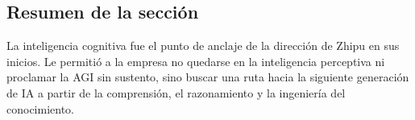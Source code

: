 \subsection{Resumen de la sección}

La inteligencia cognitiva fue el punto de anclaje de la dirección de Zhipu en sus inicios. Le permitió a la empresa no quedarse en la inteligencia perceptiva ni proclamar la AGI sin sustento, sino buscar una ruta hacia la siguiente generación de IA a partir de la comprensión, el razonamiento y la ingeniería del conocimiento.

